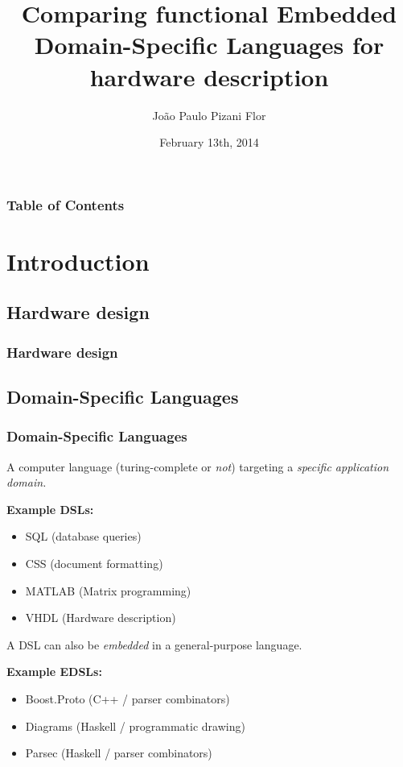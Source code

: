 \documentclass{beamer}
\title[Comparing functional EDSLs for hardware description]{Comparing functional Embedded Domain-Specific Languages for hardware description}
\date{February 13th, 2014}
\author[Pizani Flor]
{
    João Paulo Pizani Flor
}
\institute[Utrecht University]
{
    Department of Information and Computing Sciences,
    Utrecht University
}
\begin{document}
    \begin{frame}
        \titlepage
    \end{frame}

    \begin{frame}
        \frametitle{Table of Contents}
        \tableofcontents
    \end{frame}



    \section{Introduction}
    \label{sec:introduction}
        \frame{\sectionpage}

        \subsection{Hardware design}
        \label{subsec:hardware-design}
            \begin{frame}
                \frametitle{Hardware design}
            \end{frame}

        \subsection{Domain-Specific Languages}
        \label{subsec:domain-specific-languages}
            \begin{frame}
                \frametitle{Domain-Specific Languages}

                \par{A computer language (turing-complete or \emph{not}) targeting a \emph{specific application domain.}}
                \par{\textbf{Example DSLs:}}
                \begin{itemize}
                    \item SQL (database queries)
                    \item CSS (document formatting)
                    \item MATLAB (Matrix programming)
                    \item VHDL (Hardware description)
                \end{itemize}

                \pause

                \par{A DSL can also be \emph{embedded} in a general-purpose language.}
                \par{\textbf{Example EDSLs:}}
                \begin{itemize}
                    \item Boost.Proto (C++ / parser combinators)
                    \item Diagrams (Haskell / programmatic drawing)
                    \item Parsec (Haskell / parser combinators)
                \end{itemize}
            \end{frame}
\end{document}
